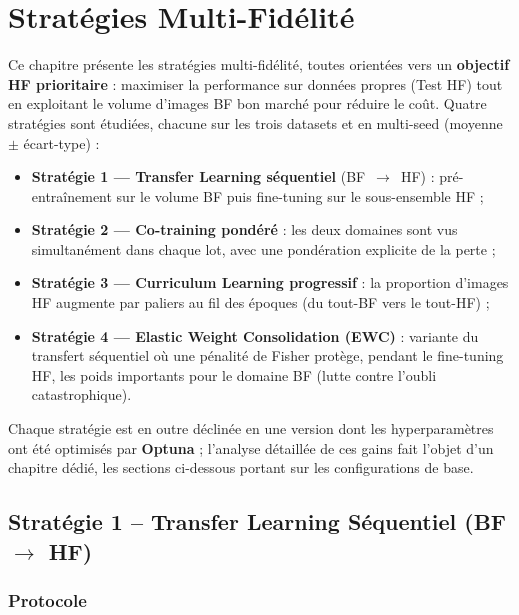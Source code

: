 \documentclass[11pt,a4paper,openany]{book}
\begin{document}
\chapter{Stratégies Multi-Fidélité}

Ce chapitre présente les stratégies multi-fidélité, toutes orientées vers un \textbf{objectif HF prioritaire} : maximiser la performance sur données propres (Test HF) tout en exploitant le volume d'images BF bon marché pour réduire le coût. Quatre stratégies sont étudiées, chacune sur les trois datasets et en multi-seed (moyenne $\pm$ écart-type) :

\begin{itemize}
  \item \textbf{Stratégie 1 — Transfer Learning séquentiel} (BF~$\rightarrow$~HF) : pré-entraînement sur le volume BF puis fine-tuning sur le sous-ensemble HF ;
  \item \textbf{Stratégie 2 — Co-training pondéré} : les deux domaines sont vus simultanément dans chaque lot, avec une pondération explicite de la perte ;
  \item \textbf{Stratégie 3 — Curriculum Learning progressif} : la proportion d'images HF augmente par paliers au fil des époques (du tout-BF vers le tout-HF) ;
  \item \textbf{Stratégie 4 — Elastic Weight Consolidation (EWC)} : variante du transfert séquentiel où une pénalité de Fisher protège, pendant le fine-tuning HF, les poids importants pour le domaine BF (lutte contre l'oubli catastrophique).
\end{itemize}

Chaque stratégie est en outre déclinée en une version dont les hyperparamètres ont été optimisés par \textbf{Optuna} ; l'analyse détaillée de ces gains fait l'objet d'un chapitre dédié, les sections ci-dessous portant sur les configurations de base.

\section{Stratégie 1 -- Transfer Learning Séquentiel (BF $\rightarrow$ HF)}

\subsection{Protocole}
\end{document}
